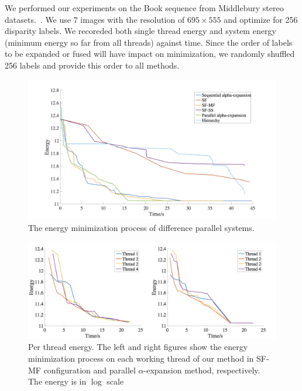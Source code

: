 
We performed our experiments on the Book sequence from Middlebury stereo
datasets.~\cite{middlebury_stereo}. We use 7 images with the
resolution of $695\times555$ and optimize for 256 disparity labels. We
recoreded both single thread energy and system energy (minimum energy
so far from all threads) against time. Since the order of labels to be
expanded or fused will have impact on minimization, we randomly
shuffled 256 labels and provide this order to all methods.

\begin{figure}[tb]
  \includegraphics[width=\columnwidth]{figure/stereo_global.png}
  \caption{The energy minimization process of difference parallel systems.}
  \label{fig:stereo_global}
\end{figure}

\begin{figure}[tb]
  \includegraphics[width=\columnwidth]{figure/stereo_threads.png}
  \caption{Per thread energy. The left and right figures show the
    energy minimization process on each working thread of our method
    in SF-MF configuration and parallel $\alpha$-expansion method,
    respectively. The energy is in $\log$ scale}
  \label{fig:stereo_threads}
\end{figure}


